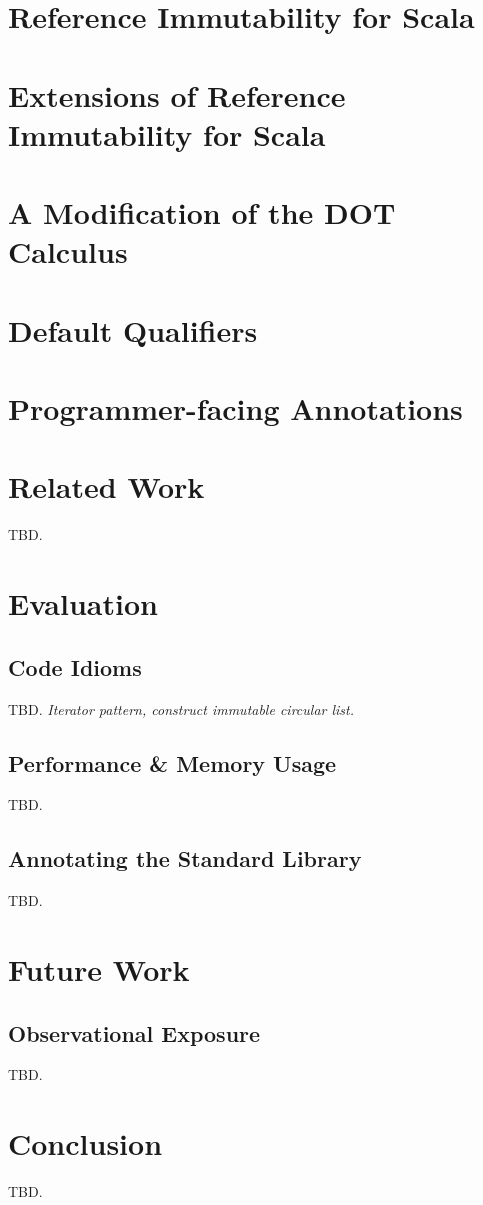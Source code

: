 \documentclass[11pt]{report}
\begin{document}
\chapter{Reference Immutability for Scala}
	\label{chap-mutable-readonly}
	


\chapter{Extensions of Reference Immutability for Scala} \label{chap-flexibility-scala}
	


\chapter{A Modification of the DOT Calculus} \label{chap-dot-calculus-emend}
	


\chapter{Default Qualifiers} \label{chap-defaults}
	


\chapter{Programmer-facing Annotations} \label{chap-annotations}
	

\chapter{Related Work} \label{chap-related-work}
TBD.

\chapter{Evaluation} \label{chap-evaluation}
\section{Code Idioms}
TBD. {\em Iterator pattern, construct immutable circular list.}
\section{Performance \& Memory Usage}
TBD.
\section{Annotating the Standard Library}
TBD.

\chapter{Future Work} \label{chap-future-work}
\section{Observational Exposure}
TBD.

\chapter{Conclusion} \label{chap-conclusion}
TBD.




\renewcommand*{\bibname}{References}

\end{document}
